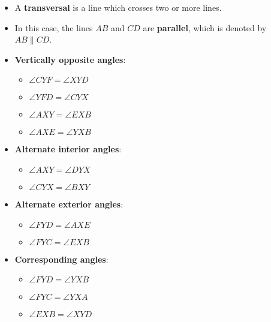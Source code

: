 \documentclass[12pt,a4paper,titlepage]{article}
\begin{document}
\begin{SummaryBox}[title=Angles formed by intersecting lines, breakable]
                \begin{SummaryExtensionBox}[title=Angles formed by a transversal, sidebyside, righthand ratio=0.45, leftlower=0pt, rightlower=0pt, center lower]
                    \begin{itemize}
                        \item A \textbf{transversal} is a line which crosses two or more lines.
                        \item In this case, the lines $AB$ and $CD$ are \textbf{parallel}, which is denoted by $AB \parallel CD$.
                        \item \textbf{Vertically opposite angles}:
                        \begin{itemize}[topsep=0pt]
                            \item $\angle CYF = \angle XYD$
                            \item $\angle YFD = \angle CYX$
                            \item $\angle AXY = \angle EXB$
                            \item $\angle AXE = \angle YXB$
                        \end{itemize}
                        \item \textbf{Alternate interior angles}:
                        \begin{itemize}
                            \item $\angle AXY = \angle DYX$
                            \item $\angle CYX = \angle BXY$
                        \end{itemize}
                        \item \textbf{Alternate exterior angles}:
                        \begin{itemize}
                            \item $\angle FYD = \angle AXE$
                            \item $\angle FYC = \angle EXB$
                        \end{itemize}
                        \item \textbf{Corresponding angles}:
                        \begin{itemize}
                            \item $\angle FYD = \angle YXB$
                            \item $\angle FYC = \angle YXA$
                            \item $\angle EXB = \angle XYD$

\end{itemize}
\end{itemize}
\end{SummaryExtensionBox}
\end{SummaryBox}
\end{document}
